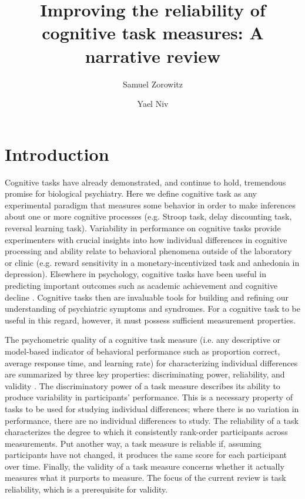 \documentclass[a4paper,notitlepage,12pt]{article}
\author[1]{Samuel Zorowitz}
\author[1,2]{Yael Niv}
\affil[1]{Princeton Neuroscience Institute, Princeton University, USA}
\affil[2]{Department of Psychology, Princeton University, USA}
\title{Improving the reliability of cognitive task measures: A narrative review}
\date{}
\begin{document}
\maketitle

\section{Introduction}


Cognitive tasks have already demonstrated, and continue to hold, tremendous promise for biological psychiatry. Here we define cognitive task as any experimental paradigm that measures some behavior in order to make inferences about one or more cognitive processes (e.g. Stroop task, delay discounting task, reversal learning task). Variability in performance on cognitive tasks provide experimenters with crucial insights into how individual differences in cognitive processing and ability relate to behavioral phenomena outside of the laboratory or clinic (e.g. reward sensitivity in a monetary-incentivized task and anhedonia in depression). Elsewhere in psychology, cognitive tasks have been useful in predicting important outcomes such as academic achievement \cite{peng2019meta, spiegel2021relations} and cognitive decline \cite{salthouse2010selective}. Cognitive tasks then are invaluable tools for building and refining our understanding of psychiatric symptoms and syndromes. For a cognitive task to be useful in this regard, however, it must possess sufficient measurement properties. 


The psychometric quality of a cognitive task measure (i.e. any descriptive or model-based indicator of behavioral performance such as proportion correct, average response time, and learning rate) for characterizing individual differences are summarized by three key properties: discriminating power, reliability, and validity \cite{kline2015handbook}. The discriminatory power of a task measure describes its ability to produce variability in participants' performance. This is a necessary property of tasks to be used for studying individual differences; where there is no variation in performance, there are no individual differences to study. The reliability of a task characterizes the degree to which it consistently rank-order participants across measurements. Put another way, a task measure is reliable if, assuming participants have not changed, it produces the same score for each participant over time. Finally, the validity of a task measure concerns whether it actually measures what it purports to measure. The focus of the current review is task reliability, which is a prerequisite for validity. 
\end{document}
